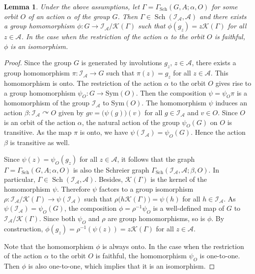 \documentclass[12pt]{article}
\newtheorem{lemma}[theorem]{Lemma}
\theoremstyle{definition}
\def\cA{\mathcal{A}}
\def\cI{\mathcal{I}}
\def\cK{\mathcal{K}}
\def\al{\alpha}
\def\Sch{\mathop{\mathrm{Sch}}}
\begin{document}
\begin{lemma}\label{factor-by-kernel}
Under the above assumptions, let $\Gamma=\Gamma_{\Sch}(G,A;\al,O)$ for some 
orbit $O$ of an action $\al$ of the group $G$.  Then 
$\Gamma\in\Sch(\cI_{\cA},\cA)$ and there exists a group homomorphism 
$\phi:G\to\cI_{\cA}/\cK(\Gamma)$ such that $\phi(g_z)=z\cK(\Gamma)$ for all 
$z\in\cA$.  In the case when the restriction of the action $\al$ to the 
orbit $O$ is faithful, $\phi$ is an isomorphism.
\end{lemma}

\begin{proof}
Since the group $G$ is generated by involutions $g_z$, $z\in\cA$, there 
exists a group homomorphism $\pi:\cI_{\cA}\to G$ such that $\pi(z)=g_z$ for 
all $z\in\cA$.  This homomorphism is onto.  The restriction of the action 
$\al$ to the orbit $O$ gives rise to a group homomorphism 
$\psi_O:G\to\mathrm{Sym}(O)$.  Then the composition $\psi=\psi_O\pi$ is a 
homomorphism of the group $\cI_{\cA}$ to $\mathrm{Sym}(O)$.  The 
homomorphism $\psi$ induces an action $\beta:\cI_{\cA}\curvearrowright O$ 
given by $gv=\bigl(\psi(g)\bigr)(v)$ for all $g\in\cI_{\cA}$ and $v\in O$.  
Since $O$ is an orbit of the action $\al$, the natural action of the group 
$\psi_O(G)$ on $O$ is transitive.  As the map $\pi$ is onto, we have 
$\psi(\cI_{\cA})=\psi_O(G)$.  Hence the action $\beta$ is transitive as 
well.

Since $\psi(z)=\psi_O(g_z)$ for all $z\in\cA$, it follows that the graph 
$\Gamma=\Gamma_{\Sch}(G,A;\al,O)$ is also the Schreier graph 
$\Gamma_{\Sch}(\cI_{\cA},\cA;\beta,O)$.  In particular, 
$\Gamma\in\Sch(\cI_{\cA},\cA)$.  Besides, $\cK(\Gamma)$ is the kernel of 
the homomorphism $\psi$.  Therefore $\psi$ factors to a group isomorphism 
$\rho:\cI_{\cA}/\cK(\Gamma)\to\psi(\cI_{\cA})$ such that 
$\rho\bigl(h\cK(\Gamma)\bigr)=\psi(h)$ for all $h\in\cI_{\cA}$.  As 
$\psi(\cI_{\cA})=\psi_O(G)$, the composition $\phi=\rho^{-1}\psi_O$ is a 
well-defined map of $G$ to $\cI_{\cA}/\cK(\Gamma)$.  Since both $\psi_O$ 
and $\rho$ are group homomorphisms, so is $\phi$.  By construction,
$\phi(g_z)=\rho^{-1}(\psi(z))=z\cK(\Gamma)$ for all $z\in\cA$.

Note that the homomorphism $\phi$ is always onto.  In the case when the 
restriction of the action $\al$ to the orbit $O$ is faithful, the 
homomorphism $\psi_O$ is one-to-one.  Then $\phi$ is also one-to-one, which 
implies that it is an isomorphism.
\end{proof}
\end{document}
